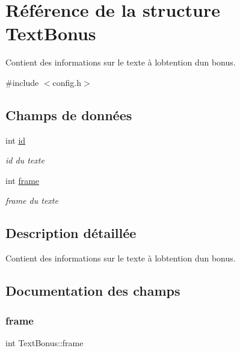 \hypertarget{struct_text_bonus}{}\section{Référence de la structure Text\+Bonus}
\label{struct_text_bonus}


Contient des informations sur le texte à l\textquotesingle{}obtention d\textquotesingle{}un bonus.  




{\ttfamily \#include $<$config.\+h$>$}

\subsection*{Champs de données}
\begin{DoxyCompactItemize}
\item 
int \hyperlink{struct_text_bonus_af1f519313a8b671621e464455951dd15}{id}
\begin{DoxyCompactList}\small\item\em id du texte \end{DoxyCompactList}\item 
int \hyperlink{struct_text_bonus_a1a997d1b68acedbb7ea82f8d240e95d9}{frame}
\begin{DoxyCompactList}\small\item\em frame du texte \end{DoxyCompactList}\end{DoxyCompactItemize}


\subsection{Description détaillée}
Contient des informations sur le texte à l\textquotesingle{}obtention d\textquotesingle{}un bonus. 

\subsection{Documentation des champs}
\mbox{\label{struct_text_bonus_a1a997d1b68acedbb7ea82f8d240e95d9}} 
\subsubsection{\texorpdfstring{frame}{frame}}
{\footnotesize\ttfamily int Text\+Bonus\+::frame}




